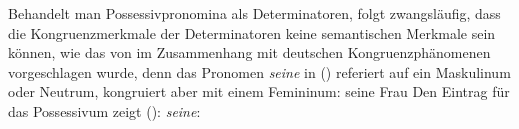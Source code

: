 Behandelt man Possessivpronomina als Determinatoren, folgt zwangsläufig, dass die Kongruenzmerkmale
der Determinatoren keine semantischen Merkmale sein können, wie das \zb von \citet[]{ps2}
im Zusammenhang mit deutschen Kongruenzphänomenen vorgeschlagen wurde, 
denn das Pronomen \emph{seine} in () referiert auf ein Maskulinum oder Neutrum, 
kongruiert aber mit einem Femininum:
\ea
seine Frau
\z
Den Eintrag für das Possessivum zeigt ():
\eas
\textit{seine}:\\
\label{le-seine-agr}
\zs
{}%

